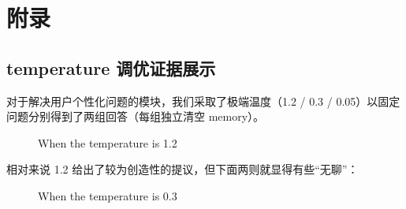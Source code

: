 \documentclass{article}
\theoremstyle{plain}
\theoremstyle{definition}
\theoremstyle{remark}
\begin{document}



\newpage
\appendix
\onecolumn
\section{附录}


\subsection{temperature 调优证据展示}

对于解决用户个性化问题的模块，我们采取了极端温度（1.2 / 0.3 / 0.05）以固定问题分别得到了两组回答（每组独立清空 memory）。

\begin{figure}[H]
\centering
{}
\caption{When the temperature is 1.2}
\label{Fig.main}
\end{figure}

相对来说 1.2 给出了较为创造性的提议，但下面两则就显得有些“无聊”：

\begin{figure}[H]
\centering
{}
\caption{When the temperature is 0.3}
\label{Fig.main}
\end{figure}
\end{document}
